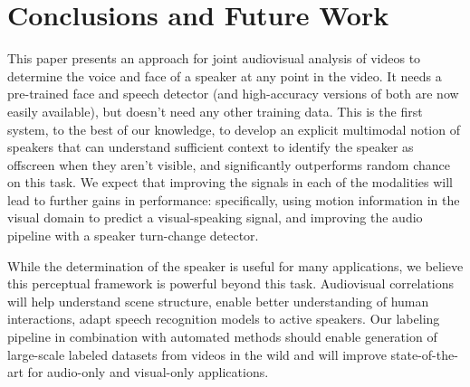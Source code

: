 \documentclass[a4paper]{article}
\begin{document}
\section{Conclusions and Future Work}
\label{sec:conclusions}

This paper presents an approach for joint audiovisual analysis of videos to determine the voice and face of a speaker at any point in the video. It needs a pre-trained face and speech detector (and high-accuracy versions of both are now easily available), but doesn't need any other training data. This is the first system, to the best of our knowledge, to develop an explicit multimodal notion of speakers that can understand sufficient context to identify the speaker as offscreen when they aren't visible, and significantly outperforms random chance on this task. We expect that improving the signals in each of the modalities will lead to further gains in performance: specifically, using motion information in the visual domain to predict a visual-speaking signal, and improving the audio pipeline with a speaker turn-change detector. 

While the determination of the speaker is useful for many applications, we believe this perceptual framework is powerful beyond this task. Audiovisual correlations will help understand scene structure, enable better understanding of human interactions, adapt speech recognition models to active speakers. Our labeling pipeline in combination with automated methods should enable generation of large-scale labeled datasets from videos in the wild and will improve state-of-the-art for audio-only and visual-only applications.



\end{document}
